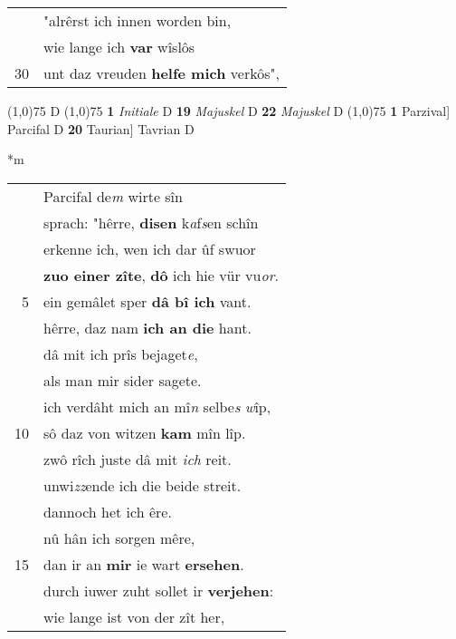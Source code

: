 \documentclass[8pt,a4paper,notitlepage]{article}
\begin{document}
\begin{table}[ht]
\begin{minipage}[t]{0.5\linewidth}
\begin{tabular}{rl}
 & "alrêrst ich innen worden bin,\\ 
 & wie lange ich \textbf{var} wîslôs\\ 
30 & unt daz vreuden \textbf{helfe mich} verkôs",\\ 
\end{tabular}
\scriptsize
\line(1,0){75} \newline
D \newline
\line(1,0){75} \newline
\textbf{1} \textit{Initiale} D  \textbf{19} \textit{Majuskel} D  \textbf{22} \textit{Majuskel} D  \newline
\line(1,0){75} \newline
\textbf{1} Parzival] Parcifal D \textbf{20} Taurian] Tavrian D \newline
\end{minipage}
\hspace{0.5cm}
\begin{minipage}[t]{0.5\linewidth}
\small
\begin{center}*m
\end{center}
\begin{tabular}{rl}
 & Parcifal  de\textit{m} wirte sîn\\ 
 & sprach: "hêrre, \textbf{disen} k\textit{a}f\textit{s}en schîn\\ 
 & erkenne ich, wen ich dar ûf swuor\\ 
 & \textbf{zuo einer zîte}, \textbf{dô} ich hie vür vu\textit{or}.\\ 
5 & ein gemâlet sper \textbf{dâ bî ich} vant.\\ 
 & hêrre, daz nam \textbf{ich an die} hant.\\ 
 & dâ mit ich prîs bejaget\textit{e},\\ 
 & als man mir sider sagete.\\ 
 & ich verdâht mich an mî\textit{n} selbe\textit{s} \textit{w}îp,\\ 
10 & sô daz von witzen \textbf{kam} mîn lîp.\\ 
 & zwô rîch juste dâ mit \textit{ich} reit.\\ 
 & unwi\textit{zz}ende ich die beide streit.\\ 
 & dannoch het ich êre.\\ 
 & nû hân ich sorgen mêre,\\ 
15 & dan ir an \textbf{mir} ie wart \textbf{ersehen}.\\ 
 & durch iuwer zuht sollet ir \textbf{verjehen}:\\ 
 & wie lange ist von der zît her,\\ 

\end{tabular}
\end{minipage}
\end{table}
\end{document}
